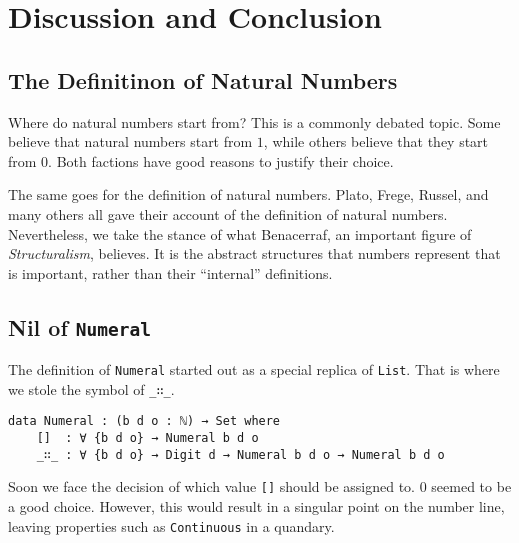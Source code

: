\documentclass[\main/thesis.tex]{subfiles}
\begin{document}
\chapter{Discussion and Conclusion}\label{conclusion}

\section{The Definitinon of Natural Numbers}

Where do natural numbers start from?
This is a commonly debated topic.
Some believe that natural numbers start from $ 1 $,
while others believe that they start from $ 0 $.
Both factions have good reasons to justify their choice.

The same goes for the definition of natural numbers.
Plato, Frege, Russel, and many others all gave their account of the definition
of natural numbers.
Nevertheless, we take the stance of what Benacerraf, an important figure of
\textit{Structuralism}, believes\cite{benacerraf1965numbers}.
It is the abstract structures that numbers represent that is important,
rather than their ``internal'' definitions.

\section{Nil of \lstinline|Numeral|}

The definition of \lstinline|Numeral| started out as a special replica of
\lstinline|List|. That is where we stole the symbol of \lstinline|_∷_|.

\begin{lstlisting}[basicstyle=\ttfamily\scriptsize]
data Numeral : (b d o : ℕ) → Set where
    []  : ∀ {b d o} → Numeral b d o
    _∷_ : ∀ {b d o} → Digit d → Numeral b d o → Numeral b d o
\end{lstlisting}

Soon we face the decision of which value \lstinline|[]| should be assigned to.
$ 0 $ seemed to be a good choice.
However, this would result in a singular point on the number line,
leaving properties such as \lstinline|Continuous| in a quandary.

\begin{center}
    \begin{adjustbox}{max width=\textwidth}
    \end{adjustbox}
\end{center}
\end{document}
